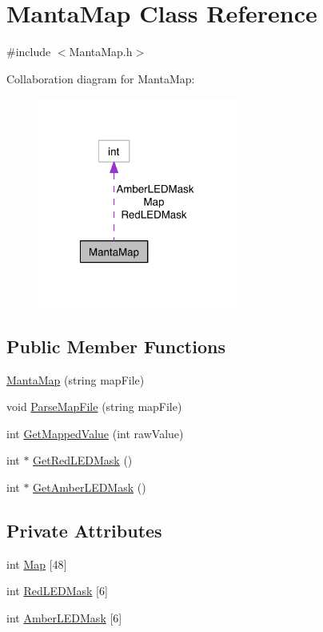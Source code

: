 \hypertarget{classMantaMap}{\section{\-Manta\-Map \-Class \-Reference}
\label{classMantaMap}
}


{\ttfamily \#include $<$\-Manta\-Map.\-h$>$}



\-Collaboration diagram for \-Manta\-Map\-:\nopagebreak
\begin{figure}[H]
\begin{center}
\leavevmode
\includegraphics[width=186pt]{classMantaMap__coll__graph}
\end{center}
\end{figure}
\subsection*{\-Public \-Member \-Functions}
\begin{DoxyCompactItemize}
\item 
\hyperlink{classMantaMap_ad0e4a6fcaf8d8aab3fb3bd56d093e379}{\-Manta\-Map} (string map\-File)
\item 
void \hyperlink{classMantaMap_aab4b35a10e6bfa3052731dc4f1643df0}{\-Parse\-Map\-File} (string map\-File)
\item 
int \hyperlink{classMantaMap_a6a6b896e367313f9fda3552798eb6fe2}{\-Get\-Mapped\-Value} (int raw\-Value)
\item 
int $\ast$ \hyperlink{classMantaMap_a5f9b04ddeb2187f0e36f1143f7234b5f}{\-Get\-Red\-L\-E\-D\-Mask} ()
\item 
int $\ast$ \hyperlink{classMantaMap_a4ae07aaaffff00ee2d9d0c7a29ff8e72}{\-Get\-Amber\-L\-E\-D\-Mask} ()
\end{DoxyCompactItemize}
\subsection*{\-Private \-Attributes}
\begin{DoxyCompactItemize}
\item 
int \hyperlink{classMantaMap_ac184760b514333563e14f7e63e684891}{\-Map} \mbox{[}48\mbox{]}
\item 
int \hyperlink{classMantaMap_ad782964640f690a7d8770ecae14a1a54}{\-Red\-L\-E\-D\-Mask} \mbox{[}6\mbox{]}
\item 
int \hyperlink{classMantaMap_a615872f874e1733857dac0eaa0b50813}{\-Amber\-L\-E\-D\-Mask} \mbox{[}6\mbox{]}
\end{DoxyCompactItemize}


